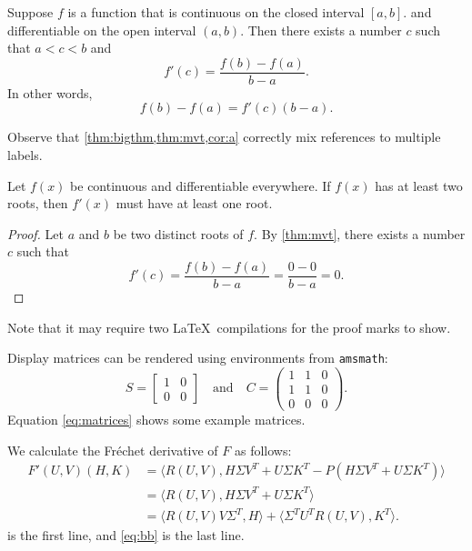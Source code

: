 \documentclass[review]{siamart}
\begin{document}
\lipsum[6]

\begin{theorem}\label{thm:mvt}
  Suppose $f$ is a function that is continuous on the closed interval
  $[a,b]$.  and differentiable on the open interval $(a,b)$.
  Then there exists a number $c$ such that $a < c < b$ and
  \begin{displaymath}
    f'(c) = \frac{f(b)-f(a)}{b-a}.
  \end{displaymath}
  In other words,
  \begin{displaymath}
    f(b)-f(a) = f'(c)(b-a).
  \end{displaymath}
\end{theorem}

Observe that \cref{thm:bigthm,thm:mvt,cor:a} correctly mix references
to multiple labels.

\begin{corollary}\label{cor:a}
  Let $f(x)$ be continuous and differentiable everywhere. If $f(x)$
  has at least two roots, then $f'(x)$ must have at least one root.
\end{corollary}
\begin{proof}
  Let $a$ and $b$ be two distinct roots of $f$.
  By \cref{thm:mvt}, there exists a number $c$ such that
  \begin{displaymath}
    f'(c) = \frac{f(b)-f(a)}{b-a} = \frac{0-0}{b-a} = 0.
  \end{displaymath}
\end{proof}

Note that it may require two \LaTeX\ compilations for the proof marks
to show.

Display matrices can be rendered using environments from \texttt{amsmath}:
\begin{equation}\label{eq:matrices}
S=\begin{bmatrix}1&0\\0&0\end{bmatrix}
\quad\text{and}\quad
C=\begin{pmatrix}1&1&0\\1&1&0\\0&0&0\end{pmatrix}.
\end{equation}
Equation \cref{eq:matrices} shows some example matrices.

We calculate the Fr\'{e}chet derivative of $F$ as follows:
\begin{subequations}
\begin{align}
  F'(U,V)(H,K) 
  &= \langle R(U,V),H\Sigma V^{T} + U\Sigma K^{T} -
  P(H\Sigma V^{T} + U\Sigma K^{T})\rangle \label{eq:aa} \\
  &= \langle R(U,V),H\Sigma V^{T} + U\Sigma K^{T}\rangle 
  \nonumber \\
  &= \langle R(U,V)V\Sigma^{T},H\rangle + 
  \langle \Sigma^{T}U^{T}R(U,V),K^{T}\rangle. \label{eq:bb}
\end{align}
\end{subequations}
 is the first line, and \cref{eq:bb} is the last line.
\end{document}
